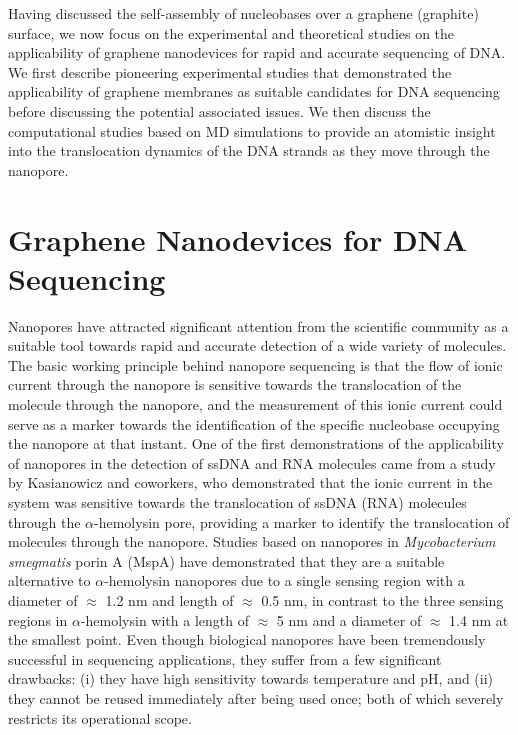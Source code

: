 Having discussed the self-assembly of nucleobases over a graphene (graphite) surface, we now focus on the experimental and theoretical studies on the applicability of graphene nanodevices for rapid and accurate sequencing of DNA. We first describe pioneering experimental studies that demonstrated the applicability of graphene membranes as suitable candidates for DNA sequencing before discussing the potential associated issues. We then discuss the computational studies based on MD simulations to provide an atomistic insight into the translocation dynamics of the DNA strands as they move through the nanopore.

\section{Graphene Nanodevices for DNA Sequencing}
Nanopores have attracted significant attention from the scientific community as a suitable tool towards rapid and accurate detection of a wide variety of molecules.\supercite{cherf_automated_2012, manrao_reading_2012, sutherland_structure_2004, chuah_nanopore_2019, liu_two-way_2013, cai_solid-state_2021, goyal_use_2015, baaken_high-resolution_2015} The basic working principle behind nanopore sequencing is that the flow of ionic current through the nanopore is sensitive towards the translocation of the molecule through the nanopore, and the measurement of this ionic current could serve as a marker towards the identification of the specific nucleobase occupying the nanopore at that instant. One of the first demonstrations of the applicability of nanopores in the detection of ssDNA and RNA molecules came from a study by Kasianowicz and coworkers, who demonstrated that the ionic current in the system was sensitive towards the translocation of ssDNA (RNA) molecules through the $\alpha$-hemolysin pore, providing a marker to identify the translocation of molecules through the nanopore.\supercite{kasianowicz_characterization_1996} Studies based on nanopores in \textit{Mycobacterium smegmatis} porin A (MspA)\supercite{faller_structure_2004} have demonstrated that they are a suitable alternative to $\alpha$-hemolysin nanopores due to a single sensing region with a diameter of $\approx$ 1.2 nm and length of $\approx$ 0.5 nm, in contrast to the three sensing regions in $\alpha$-hemolysin with a length of $\approx$ 5 nm and a diameter of $\approx$ 1.4 nm at the smallest point\supercite{stoddart_single-nucleotide_2009,stoddart_multiple_2010}. Even though biological nanopores have been tremendously successful in sequencing applications\supercite{stoddart_single-nucleotide_2009,stoddart_multiple_2010,bates_dynamics_2003,vercoutere_discrimination_2003,nakane_nanosensor_2004,stoddart_nucleobase_2010,ayub_individual_2012,di_muccio_insights_2019,wang_retarded_2020}, they suffer from a few significant drawbacks: (i) they have high sensitivity towards temperature and pH, and (ii) they cannot be reused immediately after being used once; both of which severely restricts its operational scope.\supercite{haque_solid-state_2013}

